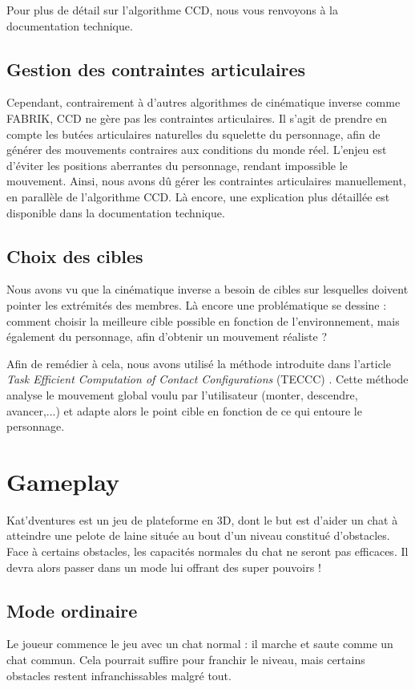 \documentclass[a4paper,11pt]{article}
\begin{document}
Pour plus de détail sur l'algorithme CCD, nous vous renvoyons à la documentation technique.



\subsection{Gestion des contraintes articulaires}
Cependant, contrairement à d'autres algorithmes de cinématique inverse comme FABRIK, CCD ne gère pas les contraintes articulaires. Il s'agit de prendre en compte les butées articulaires naturelles du squelette du personnage, afin de générer des mouvements contraires aux conditions du monde réel. L'enjeu est d'éviter les positions aberrantes du personnage, rendant impossible le mouvement. Ainsi, nous avons dû gérer les contraintes articulaires manuellement, en parallèle de l'algorithme CCD. Là encore, une explication plus détaillée est disponible dans la documentation technique.

\subsection{Choix des cibles}
Nous avons vu que la cinématique inverse a besoin de cibles sur lesquelles doivent pointer les extrémités des membres. Là encore une problématique se dessine : comment choisir la meilleure cible possible en fonction de l'environnement, mais également du personnage, afin d'obtenir un mouvement réaliste ?

Afin de remédier à cela, nous avons utilisé la méthode introduite dans l'article \textit{Task Efficient Computation of Contact Configurations}  (TECCC) \cite{tonneau:latex:14}. Cette méthode analyse le mouvement global voulu par l'utilisateur (monter, descendre, avancer,...) et adapte alors le point cible en fonction de ce qui entoure le personnage. 


\section{Gameplay}
Kat'dventures est un jeu de plateforme en 3D, dont le but est d'aider un chat à atteindre une pelote de laine située au bout d'un niveau constitué d'obstacles. Face à certains obstacles, les capacités normales du chat ne seront pas efficaces. Il devra alors passer dans un mode lui offrant des super pouvoirs !
\subsection{Mode ordinaire}
Le joueur commence le jeu avec un chat normal : il marche et saute comme un chat commun. Cela pourrait suffire pour franchir le niveau, mais certains obstacles restent infranchissables malgré tout.
\end{document}
